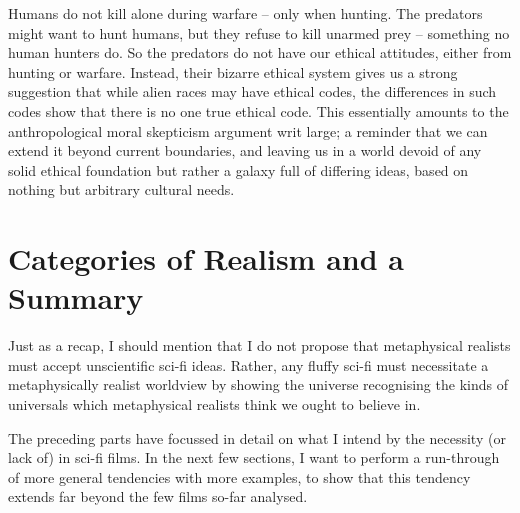 \documentclass{article}
\begin{document}
Humans do not kill alone during warfare -- only when hunting. The predators might want to hunt humans, but they refuse to kill unarmed prey -- something no human hunters do. So the predators do not have our ethical attitudes, either from hunting or warfare. Instead, their bizarre ethical system gives us a strong suggestion that while alien races may have ethical codes, the differences in such codes show that there is no one true ethical code. This essentially amounts to the anthropological moral skepticism argument writ large; a reminder that we can extend it beyond current boundaries, and leaving us in a world devoid of any solid ethical foundation but rather a galaxy full of differing ideas, based on nothing but arbitrary cultural needs.

\section{Categories of Realism and a Summary}
Just as a recap, I should mention that I do not propose that metaphysical realists must accept unscientific sci-fi ideas. Rather, any fluffy sci-fi must necessitate a metaphysically realist worldview by showing the universe recognising the kinds of universals which metaphysical realists think we ought to believe in.

The preceding parts have focussed in detail on what I intend by the necessity (or lack of) in sci-fi films. In the next few sections, I want to perform a run-through of more general tendencies with more examples, to show that this tendency extends far beyond the few films so-far analysed.
\end{document}
